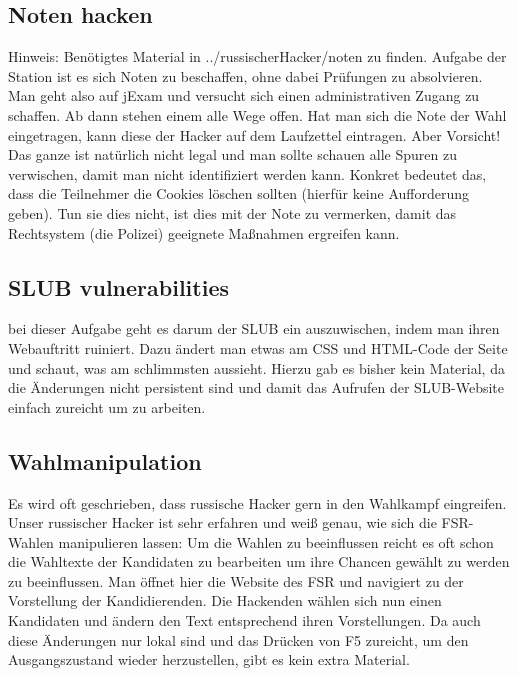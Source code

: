 \subsection{Noten hacken}
Hinweis: Benötigtes Material in ../russischerHacker/noten zu finden.
\newline
Aufgabe der Station ist es sich Noten zu beschaffen, ohne dabei Prüfungen zu absolvieren. Man geht also auf jExam und versucht sich einen administrativen Zugang zu schaffen. Ab dann stehen einem alle Wege offen. Hat man sich die Note der Wahl eingetragen, kann diese der Hacker auf dem Laufzettel eintragen. Aber Vorsicht! Das ganze ist natürlich nicht legal und man sollte schauen alle Spuren zu verwischen, damit man nicht identifiziert werden kann. Konkret bedeutet das, dass die Teilnehmer die Cookies löschen sollten (hierfür keine Aufforderung geben). Tun sie dies nicht, ist dies mit der Note zu vermerken, damit das Rechtsystem (die Polizei) geeignete Maßnahmen ergreifen kann.

\subsection{SLUB vulnerabilities}
bei dieser Aufgabe geht es darum der SLUB ein auszuwischen, indem man ihren Webauftritt ruiniert. Dazu ändert man etwas am CSS und HTML-Code der Seite und schaut, was am schlimmsten aussieht. Hierzu gab es bisher kein Material, da die Änderungen nicht persistent sind und damit das Aufrufen der SLUB-Website einfach zureicht um zu arbeiten.

\subsection{Wahlmanipulation}
Es wird oft geschrieben, dass russische Hacker gern in den Wahlkampf eingreifen. Unser russischer Hacker ist sehr erfahren und weiß genau, wie sich die FSR-Wahlen manipulieren lassen: Um die Wahlen zu beeinflussen reicht es oft schon die Wahltexte der Kandidaten zu bearbeiten um ihre Chancen gewählt zu werden zu beeinflussen. Man öffnet hier die Website des FSR und navigiert zu der Vorstellung der Kandidierenden. Die Hackenden wählen sich nun einen Kandidaten und ändern den Text entsprechend ihren Vorstellungen. Da auch diese Änderungen nur lokal sind und das Drücken von F5 zureicht, um den Ausgangszustand wieder herzustellen, gibt es kein extra Material.
